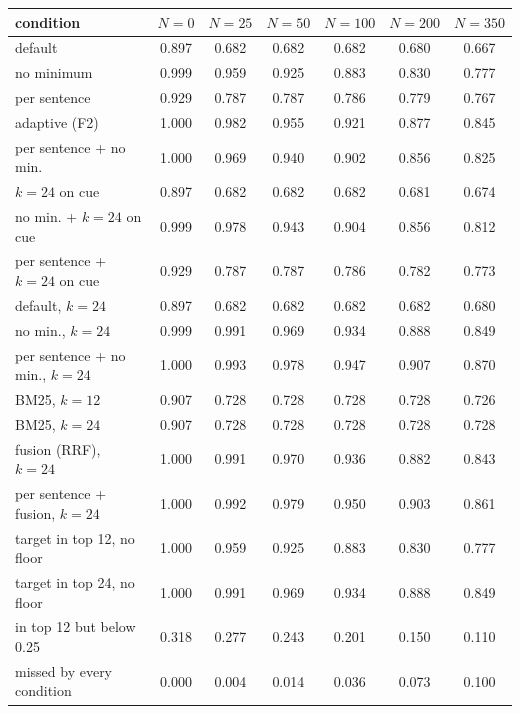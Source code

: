 \begin{tabular}{lcccccc}
\toprule
condition & $N=0$ & $N=25$ & $N=50$ & $N=100$ & $N=200$ & $N=350$ \\
\midrule
default & 0.897 & 0.682 & 0.682 & 0.682 & 0.680 & 0.667 \\
no minimum & 0.999 & 0.959 & 0.925 & 0.883 & 0.830 & 0.777 \\
per sentence & 0.929 & 0.787 & 0.787 & 0.786 & 0.779 & 0.767 \\
adaptive (F2) & 1.000 & 0.982 & 0.955 & 0.921 & 0.877 & 0.845 \\
per sentence + no min. & 1.000 & 0.969 & 0.940 & 0.902 & 0.856 & 0.825 \\
$k{=}24$ on cue & 0.897 & 0.682 & 0.682 & 0.682 & 0.681 & 0.674 \\
no min. + $k{=}24$ on cue & 0.999 & 0.978 & 0.943 & 0.904 & 0.856 & 0.812 \\
per sentence + $k{=}24$ on cue & 0.929 & 0.787 & 0.787 & 0.786 & 0.782 & 0.773 \\
default, $k{=}24$ & 0.897 & 0.682 & 0.682 & 0.682 & 0.682 & 0.680 \\
no min., $k{=}24$ & 0.999 & 0.991 & 0.969 & 0.934 & 0.888 & 0.849 \\
per sentence + no min., $k{=}24$ & 1.000 & 0.993 & 0.978 & 0.947 & 0.907 & 0.870 \\
BM25, $k{=}12$ & 0.907 & 0.728 & 0.728 & 0.728 & 0.728 & 0.726 \\
BM25, $k{=}24$ & 0.907 & 0.728 & 0.728 & 0.728 & 0.728 & 0.728 \\
fusion (RRF), $k{=}24$ & 1.000 & 0.991 & 0.970 & 0.936 & 0.882 & 0.843 \\
per sentence + fusion, $k{=}24$ & 1.000 & 0.992 & 0.979 & 0.950 & 0.903 & 0.861 \\
\midrule
target in top 12, no floor & 1.000 & 0.959 & 0.925 & 0.883 & 0.830 & 0.777 \\
target in top 24, no floor & 1.000 & 0.991 & 0.969 & 0.934 & 0.888 & 0.849 \\
in top 12 but below 0.25 & 0.318 & 0.277 & 0.243 & 0.201 & 0.150 & 0.110 \\
missed by every condition & 0.000 & 0.004 & 0.014 & 0.036 & 0.073 & 0.100 \\
\bottomrule
\end{tabular}
